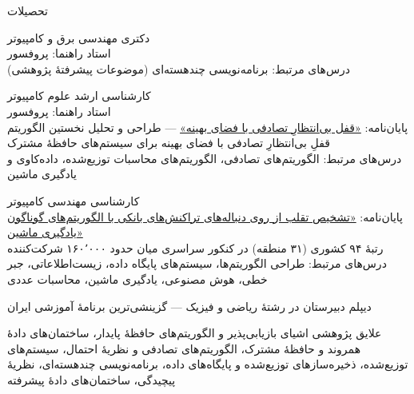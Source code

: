 \documentclass[11pt]{article}
\begin{document}
\begin{faSection}{تحصیلات}

دکتری مهندسی برق و کامپیوتر\\
استاد راهنما: پروفسور \\
درس‌های مرتبط: برنامه‌نویسی چندهسته‌ای (موضوعات پیشرفتۀ پژوهشی)

\vspace{0.5em}
کارشناسی ارشد علوم کامپیوتر\\
استاد راهنما: پروفسور \\
پایان‌نامه: \href{https://ucalgary.scholaris.ca/bitstreams/5ae5cf8f-5009-4db3-b91e-d3dbb679b5bf/download}{«قفل بی‌انتظارِ تصادفی با فضای بهینه»} --- طراحی و تحلیل نخستین الگوریتم قفلِ بی‌انتظارِ تصادفی با فضای بهینه برای سیستم‌های حافظۀ مشترک\\
درس‌های مرتبط: الگوریتم‌های تصادفی، الگوریتم‌های محاسبات توزیع‌شده، داده‌کاوی و یادگیری ماشین

\vspace{0.5em}
کارشناسی مهندسی کامپیوتر\\
پایان‌نامه: \href{https://github.com/kahbodaeini/Fraud-Detection}{«تشخیص تقلب از روی دنباله‌های تراکنش‌های بانکی با الگوریتم‌های گوناگون یادگیری ماشین»}\\
رتبۀ ۹۴ کشوری (۳۱ منطقه) در کنکور سراسری میان حدود ۱۶۰٬۰۰۰ شرکت‌کننده\\
درس‌های مرتبط: طراحی الگوریتم‌ها، سیستم‌های پایگاه داده، زیست‌اطلاعاتی، جبر خطی، هوش مصنوعی، یادگیری ماشین، محاسبات عددی

\vspace{0.5em}
دیپلم دبیرستان در رشتۀ ریاضی و فیزیک --- گزینشی‌ترین برنامۀ آموزشی ایران

\end{faSection}

\begin{faSection}{علایق پژوهشی}
اشیای بازیابی‌پذیر و الگوریتم‌های حافظۀ پایدار، ساختمان‌های دادۀ همروند و حافظۀ مشترک،
الگوریتم‌های تصادفی و نظریۀ احتمال، سیستم‌های توزیع‌شده، ذخیره‌سازهای توزیع‌شده و پایگاه‌های داده،
برنامه‌نویسی چندهسته‌ای، نظریۀ پیچیدگی، ساختمان‌های دادۀ پیشرفته
\end{faSection}
\end{document}
